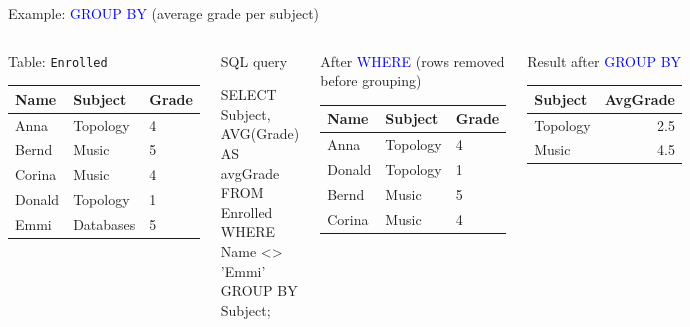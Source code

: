 \documentclass[10pt,aspectratio=169]{beamer}
\newcommand{\sqlk}[1]{\textcolor{blue}{#1}}
\begin{document}
\begin{frame}[fragile]{Example: \sqlk{GROUP BY} (average grade per subject)}
\small
\begin{columns}[T,onlytextwidth]

\begin{block}{Table: \texttt{Enrolled}}
\footnotesize
\centering
\begin{tabular}{@{}lll@{}}
\toprule
\textbf{Name} & \textbf{Subject} & \textbf{Grade}\\
\midrule
Anna   & Topology  & 4\\
Bernd  & Music     & 5\\
Corina & Music     & 4\\
Donald  & Topology  & 1\\
Emmi   & Databases & 5\\
\bottomrule
\end{tabular}
\end{block}

\vspace{1mm}
\begin{block}{SQL query}
\begin{codesql}
SELECT Subject, AVG(Grade) AS avgGrade
FROM Enrolled
WHERE Name <> 'Emmi'
GROUP BY Subject;
\end{codesql}
\end{block}


\begin{block}{After \sqlk{WHERE} (rows removed before grouping)}
\footnotesize
\centering
\begin{tabular}{@{}lll@{}}
\toprule
\textbf{Name} & \textbf{Subject} & \textbf{Grade}\\
\midrule
Anna   & Topology & 4\\
Donald  & Topology & 1\\
Bernd  & Music    & 5\\
Corina & Music    & 4\\
\bottomrule
\end{tabular}
\end{block}

\vspace{1mm}
\begin{block}{Result after \sqlk{GROUP BY}}
\footnotesize
\centering
\begin{tabular}{@{}lr@{}}
\toprule
\textbf{Subject} & \textbf{AvgGrade}\\
\midrule
Topology & 2.5\\
Music    & 4.5\\
\bottomrule
\end{tabular}
\end{block}

\end{columns}
\end{frame}
\end{document}

